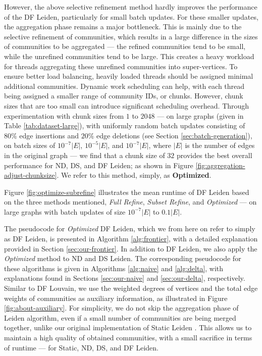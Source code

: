 However, the above selective refinement method hardly improves the performance of the DF Leiden, particularly for small batch updates. For these smaller updates, the aggregation phase remains a major bottleneck. This is mainly due to the selective refinement of communities, which results in a large difference in the sizes of communities to be aggregated --- the refined communities tend to be small, while the unrefined communities tend to be large. This creates a heavy workload for threads aggregating these unrefined communities into super-vertices. To ensure better load balancing, heavily loaded threads should be assigned minimal additional communities. Dynamic work scheduling can help, with each thread being assigned a smaller range of community IDs, or chunks. However, chunk sizes that are too small can introduce significant scheduling overhead. Through experimentation with chunk sizes from $1$ to $2048$ --- on large graphs (given in Table \ref{tab:dataset-large}), with uniformly random batch updates consisting of $80\%$ edge insertions and $20\%$ edge deletions (see Section \ref{sec:batch-generation}), on batch sizes of $10^{-7}|E|$, $10^{-5}|E|$, and $10^{-7}|E|$, where $|E|$ is the number of edges in the original graph --- we find that a chunk size of $32$ provides the best overall performance for ND, DS, and DF Leiden; as shown in Figure \ref{fig:aggregation-adjust-chunksize}. We refer to this method, simply, as \textbf{Optimized}.

Figure \ref{fig:optimize-subrefine} illustrates the mean runtime of DF Leiden based on the three methods mentioned, \textit{Full Refine}, \textit{Subset Refine}, and \textit{Optimized} --- on large graphs with batch updates of size $10^{-7}|E|$ to $0.1|E|$.

The pseudocode for \textit{Optimized} DF Leiden, which we from here on refer to simply as DF Leiden, is presented in Algorithm \ref{alg:frontier}, with a detailed explanation provided in Section \ref{sec:our-frontier}. In addition to DF Leiden, we also apply the \textit{Optimized} method to ND and DS Leiden. The corresponding pseudocode for these algorithms is given in Algorithms \ref{alg:naive} and \ref{alg:delta}, with explanations found in Sections \ref{sec:our-naive} and \ref{sec:our-delta}, respectively. Similar to DF Louvain, we use the weighted degrees of vertices and the total edge weights of communities as auxiliary information, as illustrated in Figure \ref{fig:about-auxiliary}. For simplicity, we do not skip the aggregation phase of Leiden algorithm, even if a small number of communities are being merged together, unlike our original implementation of Static Leiden \cite{sahu2023gveleiden}. This allows us to maintain a high quality of obtained communities, with a small sacrifice in terms of runtime --- for Static, ND, DS, and DF Leiden.




